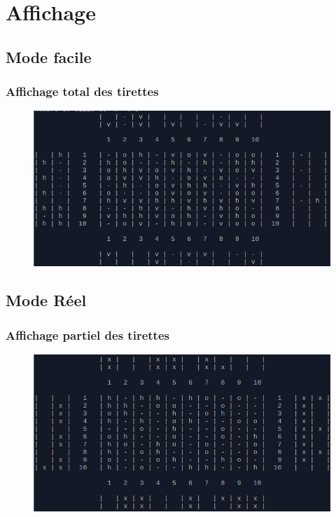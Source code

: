 \section{Affichage}
	\subsection{Mode facile}
		\begin{frame}
			\frametitle{\textbf{Affichage total des tirettes}}
			\begin{figure}[h]
					\centering
					\includegraphics[scale=0.40]{images/tirette/plateau_entier.png}
			\end{figure}		
		\end{frame}
	
	\subsection{Mode Réel}
		\begin{frame}
			\frametitle{\textbf{Affichage partiel des tirettes}}
			\begin{figure}[h]
				\centering
				\includegraphics[scale=0.40]{images/tirette/affichage_entier_reel.png}
			\end{figure}
		\end{frame}
	
	
	